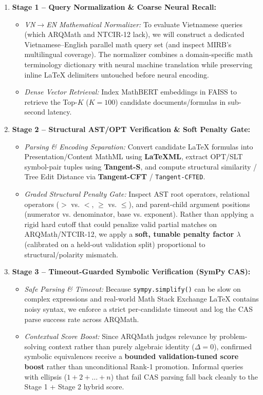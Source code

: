 ﻿\documentclass[11pt,a4paper]{article}
\begin{document}
	\begin{enumerate}
		\item \textbf{Stage 1 -- Query Normalization \& Coarse Neural Recall:}
		\begin{itemize}
			\item \textit{VN$\to$EN Mathematical Normalizer:} To evaluate Vietnamese queries (which ARQMath and NTCIR-12 lack), we will construct a dedicated Vietnamese--English parallel math query set (and inspect MIRB's multilingual coverage). The normalizer combines a domain-specific math terminology dictionary with neural machine translation while preserving inline \LaTeX{} delimiters untouched before neural encoding.
			\item \textit{Dense Vector Retrieval:} Index MathBERT embeddings in FAISS to retrieve the Top-$K$ ($K=100$) candidate documents/formulas in sub-second latency.
		\end{itemize}
		\item \textbf{Stage 2 -- Structural AST/OPT Verification \& Soft Penalty Gate:}
		\begin{itemize}
			\item \textit{Parsing \& Encoding Separation:} Convert candidate \LaTeX{} formulas into Presentation/Content MathML using \textbf{LaTeXML}, extract OPT/SLT symbol-pair tuples using \textbf{Tangent-S}, and compute structural similarity / Tree Edit Distance via \textbf{Tangent-CFT} / \texttt{Tangent-CFTED}.
			\item \textit{Graded Structural Penalty Gate:} Inspect AST root operators, relational operators ($>$ vs. $<$, $\ge$ vs. $\le$), and parent-child argument positions (numerator vs. denominator, base vs. exponent). Rather than applying a rigid hard cutoff that could penalize valid partial matches on ARQMath/NTCIR-12, we apply a \textbf{soft, tunable penalty factor $\lambda$} (calibrated on a held-out validation split) proportional to structural/polarity mismatch.
		\end{itemize}
		\item \textbf{Stage 3 -- Timeout-Guarded Symbolic Verification (SymPy CAS):}
		\begin{itemize}
			\item \textit{Safe Parsing \& Timeout:} Because \texttt{sympy.simplify()} can be slow on complex expressions and real-world Math Stack Exchange \LaTeX{} contains noisy syntax, we enforce a strict per-candidate timeout and log the CAS parse success rate across ARQMath.
			\item \textit{Contextual Score Boost:} Since ARQMath judges relevance by problem-solving context rather than purely algebraic identity ($\Delta = 0$), confirmed symbolic equivalences receive a \textbf{bounded validation-tuned score boost} rather than unconditional Rank-1 promotion. Informal queries with ellipsis ($1+2+\dots+n$) that fail CAS parsing fall back cleanly to the Stage 1 + Stage 2 hybrid score.

\end{itemize}
\end{enumerate}
\end{document}
